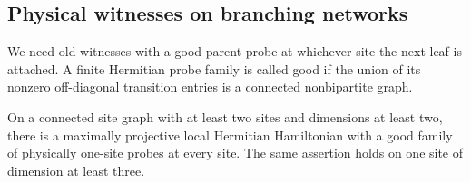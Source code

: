 \subsection{Physical witnesses on branching networks}

We need old witnesses with a good parent probe at whichever site the
next leaf is attached. A finite Hermitian probe family is called good
if the union of its nonzero off-diagonal transition entries is a
connected nonbipartite graph.

\begin{lemma}\label{lem:witness}
On a connected site graph with at least two sites and dimensions at
least two, there is a maximally projective local Hermitian Hamiltonian
with a good family of physically one-site probes at every site.
The same assertion holds on one site of dimension at least three.
\end{lemma}

